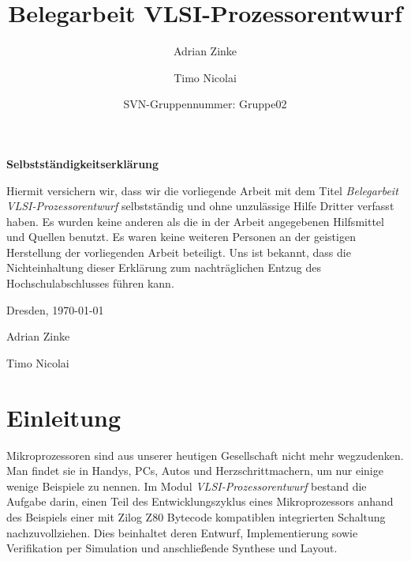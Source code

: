 \documentclass[ngerman, cd=lightcolor]{tudscrreprt}
\begin{document}

\title{Belegarbeit VLSI-Prozessorentwurf}

\author{%
  Adrian Zinke%
\and%
  Timo Nicolai%
\and%
  SVN-Gruppennummer: Gruppe02%
}

\headingsvskip=-100pt

\maketitle
\tableofcontents
\pagebreak

\sloppy

\vspace*{100px}

\centerline{\textbf{Selbstständigkeitserklärung}}

\vspace{10px}

\noindent
Hiermit versichern wir, dass wir die vorliegende Arbeit mit dem Titel
\textit{Belegarbeit VLSI-Prozessorentwurf} selbstständig und ohne unzulässige
Hilfe Dritter verfasst haben. Es wurden keine anderen als die in der Arbeit
angegebenen Hilfsmittel und Quellen benutzt. Es waren keine weiteren Personen
an der geistigen Herstellung der vorliegenden Arbeit beteiligt. Uns ist
bekannt, dass die Nichteinhaltung dieser Erklärung zum nachträglichen Entzug
des Hochschulabschlusses führen kann.

\vspace{10px}

\noindent
Dresden, \today

\vspace{40px}

\noindent
Adrian Zinke

\vspace{40px}

\noindent
Timo Nicolai

\chapter{Einleitung}

Mikroprozessoren sind aus unserer heutigen Gesellschaft nicht mehr wegzudenken.
Man findet sie in Handys, PCs, Autos und Herzschrittmachern, um nur einige
wenige Beispiele zu nennen. Im Modul \textit{VLSI-Prozessorentwurf} bestand die
Aufgabe darin, einen Teil des Entwicklungszyklus eines Mikroprozessors anhand
des Beispiels einer mit Zilog Z80 Bytecode kompatiblen integrierten Schaltung
nachzuvollziehen. Dies beinhaltet deren Entwurf, Implementierung sowie
Verifikation per Simulation und anschließende Synthese und Layout.
\end{document}
